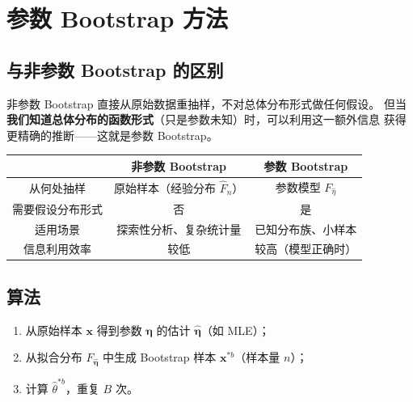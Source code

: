 \section{参数 Bootstrap 方法}

\subsection{与非参数 Bootstrap 的区别}

非参数 Bootstrap 直接从原始数据重抽样，不对总体分布形式做任何假设。
但当\textbf{我们知道总体分布的函数形式}（只是参数未知）时，可以利用这一额外信息
获得更精确的推断——这就是参数 Bootstrap。

\begin{center}
\begin{tabular}{c|c|c}
    \toprule
    & 非参数 Bootstrap & 参数 Bootstrap \\
    \midrule
    从何处抽样 & 原始样本（经验分布 $\hat{F}_n$） & 参数模型 $F_{\hat{\eta}}$ \\
    需要假设分布形式 & 否 & 是 \\
    适用场景 & 探索性分析、复杂统计量 & 已知分布族、小样本 \\
    信息利用效率 & 较低 & 较高（模型正确时） \\
    \bottomrule
\end{tabular}
\end{center}

\subsection{算法}

\begin{enumerate}
    \item 从原始样本 $\bm{x}$ 得到参数 $\bm{\eta}$ 的估计 $\hat{\bm{\eta}}$（如 MLE）；
    \item 从拟合分布 $F_{\hat{\bm{\eta}}}$ 中生成 Bootstrap 样本 $\bm{x}^{*b}$（样本量 $n$）；
    \item 计算 $\hat{\theta}^{*b}$，重复 $B$ 次。
\end{enumerate}

